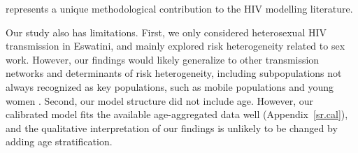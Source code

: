 represents a unique methodological contribution to the HIV modelling literature.
\par
Our study also has limitations. %
First, we only considered heterosexual HIV transmission in Eswatini,  %
and mainly explored risk heterogeneity related to sex work.
However, our findings would likely generalize
to other transmission networks and determinants of risk heterogeneity,
including subpopulations not always recognized as key populations,
such as mobile populations and young women \cite{Camlin2019,Cheuk2020}. %
Second, our model structure did not include age.
However, our calibrated model fits
the available age-aggregated data well (Appendix~\ref{sr.cal}),
and the qualitative interpretation of our findings %
is unlikely to be changed by adding age stratification.
